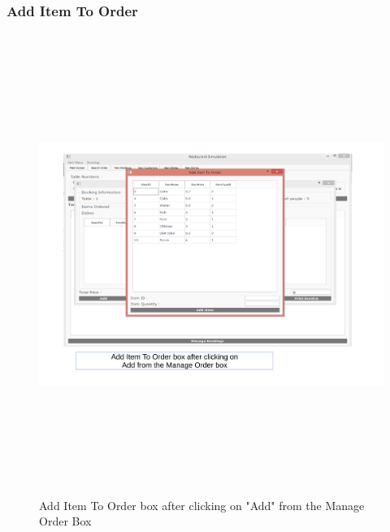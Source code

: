 \begin{landscape}
\subsubsection{Add Item To Order}
\begin{figure}[H]
    \includegraphics[height = 15cm]{./Maintenance/images/screen11}
    \caption{Add Item To Order box after clicking on "Add" from the Manage Order Box} \label{fig:screen11}
\end{figure}


\end{landscape}
